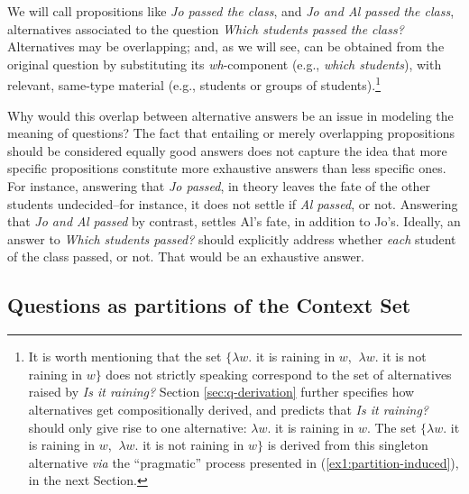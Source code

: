 We will call propositions like \textit{Jo passed the class}, and \textit{Jo and Al passed the class}, alternatives associated to the question \textit{Which students passed the class?} Alternatives may be overlapping; and, as we will see, can be obtained from the original question by substituting its \textit{wh}-component (e.g., \textit{which students}), with relevant, same-type material (e.g., students or groups of students).\footnote{It is worth mentioning that the set $\lbrace\lambda w. $ it is raining in $w$, $ \ \lambda w. $ it is not raining in $w \rbrace$ does not strictly speaking correspond to the set of alternatives raised by \textit{Is it raining?} Section \ref{sec:q-derivation} further specifies how alternatives get compositionally derived, and predicts that \textit{Is it raining?} should only give rise to one alternative: $\lambda w. $ it is raining in $w$. The set $\lbrace\lambda w. $ it is raining in $w$, $ \ \lambda w. $ it is not raining in $w \rbrace$ is derived from this singleton alternative \textit{via} the ``pragmatic'' process presented in (\ref{ex1:partition-induced}), in the next Section.}


\begin{exe}
\end{exe}


Why would this overlap between alternative answers be an issue in modeling the meaning of questions? The fact that entailing or merely overlapping propositions should be considered equally good answers does not capture the idea that more specific propositions constitute more exhaustive answers than less specific ones. For instance, answering that \textit{Jo passed}, in theory leaves the fate of the other students undecided--for instance, it does not settle if \textit{Al passed}, or not. Answering that \textit{Jo and Al passed} by contrast, settles Al's fate, in addition to Jo's. Ideally, an answer to \textit{Which students passed?} should explicitly address whether \textit{each} student of the class passed, or not. That would be an exhaustive answer.

\subsection{Questions as partitions of the Context Set}

